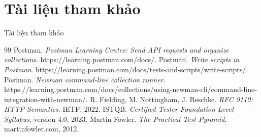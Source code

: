 \documentclass[aspectratio=169,10pt]{beamer}
\begin{document}
\section{Tài liệu tham khảo}

\begin{frame}[shrink=10]{Tài liệu tham khảo}
  \begin{thebibliography}{99}
      Postman. \textit{Postman Learning Center: Send API requests and organize collections}. https://learning.postman.com/docs/.
      Postman. \textit{Write scripts in Postman}. https://learning.postman.com/docs/tests-and-scripts/write-scripts/.
      Postman. \textit{Newman command-line collection runner}. https://learning.postman.com/docs/collections/using-newman-cli/command-line-integration-with-newman/.
      R. Fielding, M. Nottingham, J. Reschke. \textit{RFC 9110: HTTP Semantics}. IETF, 2022.
      ISTQB. \textit{Certified Tester Foundation Level Syllabus}, version 4.0, 2023.
      Martin Fowler. \textit{The Practical Test Pyramid}. martinfowler.com, 2012.
  \end{thebibliography}
\end{frame}
\end{document}
